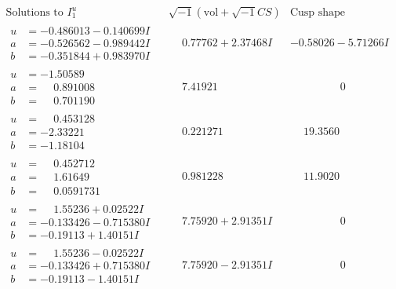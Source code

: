 \documentclass[1p]{elsarticle_modified}
\theoremstyle{definition}
\newcommand{\I}{\sqrt{-1}}
\begin{document}
$$\begin{array}{c|c|c}
\text{Solutions to }I^u_{1}& \I (\text{vol} + \sqrt{-1}CS) & \text{Cusp shape}\\
 \hline 
\begin{aligned}
u &= -0.486013 - 0.140699 I \\
a &= -0.526562 - 0.989442 I \\
b &= -0.351844 + 0.983970 I\end{aligned}
 & \phantom{-}0.77762 + 2.37468 I & -0.58026 - 5.71266 I \\ \hline\begin{aligned}
u &= -1.50589\phantom{ +0.000000I} \\
a &= \phantom{-}0.891008\phantom{ +0.000000I} \\
b &= \phantom{-}0.701190\phantom{ +0.000000I}\end{aligned}
 & \phantom{-}7.41921\phantom{ +0.000000I} & \phantom{-0.000000 } 0 \\ \hline\begin{aligned}
u &= \phantom{-}0.453128\phantom{ +0.000000I} \\
a &= -2.33221\phantom{ +0.000000I} \\
b &= -1.18104\phantom{ +0.000000I}\end{aligned}
 & \phantom{-}0.221271\phantom{ +0.000000I} & \phantom{-}19.3560\phantom{ +0.000000I} \\ \hline\begin{aligned}
u &= \phantom{-}0.452712\phantom{ +0.000000I} \\
a &= \phantom{-}1.61649\phantom{ +0.000000I} \\
b &= \phantom{-}0.0591731\phantom{ +0.000000I}\end{aligned}
 & \phantom{-}0.981228\phantom{ +0.000000I} & \phantom{-}11.9020\phantom{ +0.000000I} \\ \hline\begin{aligned}
u &= \phantom{-}1.55236 + 0.02522 I \\
a &= -0.133426 - 0.715380 I \\
b &= -0.19113 + 1.40151 I\end{aligned}
 & \phantom{-}7.75920 + 2.91351 I & \phantom{-0.000000 } 0 \\ \hline\begin{aligned}
u &= \phantom{-}1.55236 - 0.02522 I \\
a &= -0.133426 + 0.715380 I \\
b &= -0.19113 - 1.40151 I\end{aligned}
 & \phantom{-}7.75920 - 2.91351 I & \phantom{-0.000000 } 0 \\ \hline\begin{aligned}

\end{aligned}
\end{array}$$
\end{document}
